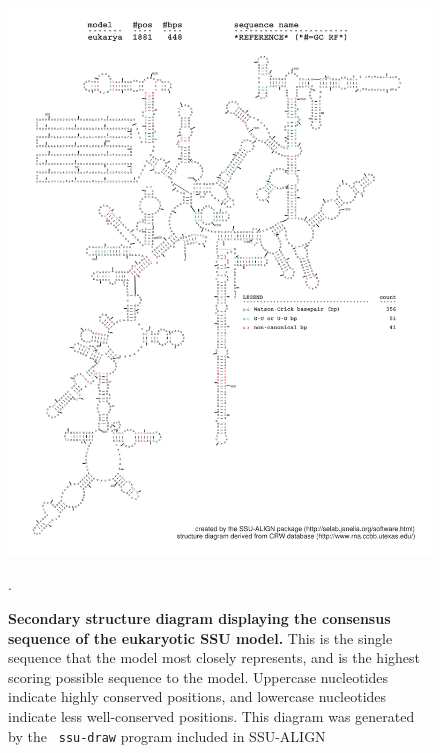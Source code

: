\newpage 
\begin{figure}
\begin{center}
\includegraphics[width=5.64in]{Figures/eukarya-0p1-rf}
\end{center}
\caption[Secondary structure diagram displaying the consensus sequence
  of the eukaryotic SSU model]{\textbf{Secondary structure diagram displaying the
  consensus sequence of the eukaryotic SSU model.} 
  This is the single sequence that the model 
  most closely represents, and is the highest scoring possible
  sequence to the model. Uppercase nucleotides indicate highly conserved positions,
  and lowercase nucleotides indicate less well-conserved positions.
  This diagram was generated by the {\tt
  ssu-draw} program included in SSU-ALIGN}.
\label{fig:eukrf}
\end{figure}

\newpage 

